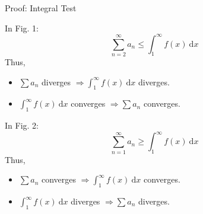 \documentclass[12pt,a4paper]{article}
\def\d{{\mathrm{d}}}
\def\dx{\d x}
\begin{document}
\begin{prf}{Proof: Integral Test}
	In Fig. 1: $$\sum_{n=2}^\infty a_n\leq\int_1^\infty f(x)\ \dx$$
	Thus, 
	\begin{itemize}
		\item $\displaystyle\sum{a_n}$ diverges $\Longrightarrow\displaystyle\int_1^\infty f(x)\ \dx$ diverges. 
		\item $\displaystyle\int_1^\infty f(x)\ \dx$ converges $\Longrightarrow \displaystyle\sum{a_n}$ converges. 
	\end{itemize}
	In Fig. 2: $$\sum_{n=1}^\infty a_n\geq\int_1^\infty f(x)\ \dx$$
	Thus, 
	\begin{itemize}
		\item $\displaystyle\sum{a_n}$ converges $\Longrightarrow\displaystyle\int_1^\infty f(x)\ \dx$ converges. 
		\item $\displaystyle\int_1^\infty f(x)\ \dx$ diverges $\Longrightarrow \displaystyle\sum{a_n}$ diverges. 
	\end{itemize}
\end{prf}
\end{document}
